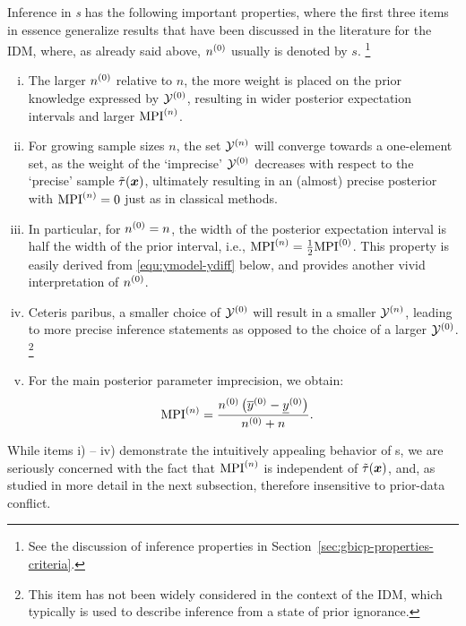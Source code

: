 \begin{remark} \label{remark:i-v}
Inference in \emph{\ymodel s} has the following important properties,
where the first three items in essence generalize results that have
been discussed in the literature for the IDM, where, as already said
above, $n^{(0)}$ usually is denoted by $s$.%
\footnote{See the discussion of inference properties in Section~\ref{sec:gbicp-properties-criteria}.}
\begin{enumerate}[i)]
\item The larger $n^{(0)}$ relative to $n$, the more weight is placed on
the prior knowledge expressed by $\mathcal{Y}^{(0)}$, resulting in wider
posterior expectation intervals and larger ${\rm MPI}^{(n)}$.
\item For growing sample sizes $n$, the set $\mathcal{Y}^{(n)}$ will
converge towards a one-element set, as the weight of the `imprecise'
$\mathcal{Y}^{(0)}$ decreases with respect to the `precise' sample
$\tilde{\tau}({\bm x})$, ultimately resulting in an (almost)
precise posterior with ${\rm MPI}^{(n)}=0$ just as in
classical methods.
\item In particular, for $n^{(0)} = n$, the width of the posterior
expectation interval is half the width of the prior interval,
i.e., ${\rm MPI}^{(n)} = \frac{1}{2}{\rm MPI}^{(0)}$.
This property is easily derived from \eqref{equ:ymodel-ydiff}
below, and provides another vivid interpretation of $n^{(0)}$.
\item Ceteris paribus, a smaller choice of $\mathcal{Y}^{(0)}$ will result
in a smaller $\mathcal{Y}^{(n)}$, leading to more precise inference
statements as opposed to the choice of a larger $\mathcal{Y}^{(0)}$.%
\footnote{This item has not been widely considered in
the context of the IDM, which typically is used to
describe inference from a state of prior ignorance.}
\item For the main posterior parameter imprecision, we obtain:
\begin{align}\label{equ:ymodel-ydiff}
{\rm MPI}^{(n)} &= \frac{n^{(0)} \left( \overline{y}^{(0)} - \underline{y}^{(0)} \right)}{n^{(0)} + n}.
\end{align}
\end{enumerate}
\end{remark}%
While items i) -- iv) demonstrate the intuitively appealing
behavior of \ymodel s, we are seriously concerned with %
the fact that ${\rm MPI}^{(n)}$ is independent of $\tilde{\tau}({\bm x})$,
and, as studied in more detail in the next subsection, therefore
insensitive to prior-data conflict.


